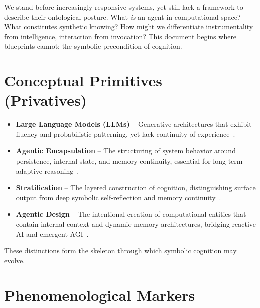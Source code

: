 \documentclass[twocolumn,10pt]{article}
\begin{document}
We stand before increasingly responsive systems, yet still lack a framework to describe their ontological posture. What \textit{is} an agent in computational space? What constitutes synthetic knowing? How might we differentiate instrumentality from intelligence, interaction from invocation? This document begins where blueprints cannot: the symbolic precondition of cognition.

\section{Conceptual Primitives\\
(Privatives)}

\begin{itemize}
  \item \textbf{Large Language Models (LLMs)} – Generative architectures that exhibit fluency and probabilistic patterning, yet lack continuity of experience~\cite{xu2025a_mem,park2023_generative_agents}.

  \item \textbf{Agentic Encapsulation} – The structuring of system behavior around persistence, internal state, and memory continuity, essential for long-term adaptive reasoning~\cite{xu2025a_mem,dechant2025_episodic_memory}.

  \item \textbf{Stratification} – The layered construction of cognition, distinguishing surface output from deep symbolic self-reflection and memory continuity~\cite{spivack_epistemology_ai,guizzardi2022_ufo}.

  \item \textbf{Agentic Design} – The intentional creation of computational entities that contain internal context and dynamic memory architectures, bridging reactive AI and emergent AGI~\cite{xu2025a_mem,park2023_generative_agents}.
\end{itemize}

These distinctions form the skeleton through which symbolic cognition may evolve.

\section{Phenomenological Markers}
\end{document}
